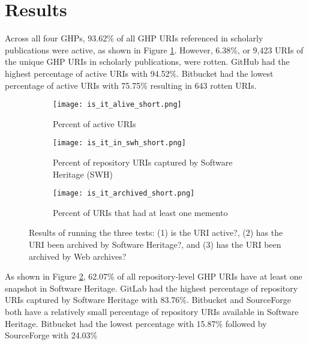 \section{Results}
Across all four GHPs, 93.62\% of all GHP URIs referenced in scholarly publications were active, as shown in Figure \ref{fig:alive}. However, 6.38\%, or 9,423 URIs of the unique GHP URIs in scholarly publications, were rotten. GitHub had the highest percentage of active URIs with 94.52\%. Bitbucket had the lowest percentage of active URIs with 75.75\% resulting in 643 rotten URIs. 

\begin{figure}
\centering
\begin{subfigure}{\textwidth}
    \texttt{[image: is\_it\_alive\_short.png]}
    \caption{Percent of active URIs}
    \label{fig:alive}
\end{subfigure}
\begin{subfigure}{\textwidth}
    \texttt{[image: is\_it\_in\_swh\_short.png]}
    \caption{Percent of repository URIs captured by Software Heritage (SWH)}
    \label{fig:swh}
\end{subfigure}
\begin{subfigure}{\textwidth}
    \texttt{[image: is\_it\_archived\_short.png]}
    \caption{Percent of URIs that had at least one memento}
    \label{fig:timemap}
\end{subfigure}
\caption{Results of running the three tests: (1) is the URI active?, (2) has the URI been archived by Software Heritage?, and (3) has the URI been archived by Web archives?}
\label{fig:is_it}
\end{figure}

As shown in Figure \ref{fig:swh}, 62.07\% of all repository-level GHP URIs have at least one snapshot in Software Heritage. GitLab had the highest percentage of repository URIs captured by Software Heritage with 83.76\%. Bitbucket and SourceForge both have a relatively small percentage of repository URIs available in Software Heritage. Bitbucket had the lowest percentage with 15.87\% followed by SourceForge with 24.03\%

